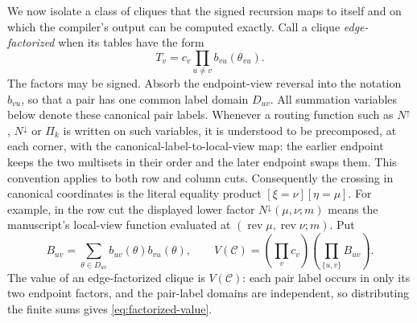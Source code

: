 \documentclass[11pt]{article}
\theoremstyle{definition}
\theoremstyle{remark}
\begin{document}
We now isolate a class of cliques that the signed recursion maps to
itself and on which the compiler's output can be computed exactly.
Call a clique \emph{edge-factorized} when its tables have the form
\[
 T_v=c_v\prod_{u\ne v}b_{vu}(\theta_{vu}).
 \tag{\thesection.5}\label{eq:edge-factorized}
\]
The factors may be signed. Absorb the endpoint-view reversal into the
notation $b_{vu}$, so that a pair has one common label domain $D_{uv}$.
All summation variables below denote these canonical pair labels.
Whenever a routing function such as $N^{\uparrow}$,
$N^{\downarrow}$ or $\Pi_k$ is written on such variables, it
is understood to be precomposed, at each corner, with the
canonical-label-to-local-view map: the earlier endpoint keeps
the two multisets in their order and the later endpoint swaps
them. This convention applies to both row and column cuts.
Consequently the crossing in canonical coordinates is the literal
equality product $[\xi=\nu][\eta=\mu]$. For example, in the
row cut the displayed lower factor
$N^{\downarrow}(\mu,\nu;m)$ means the manuscript's local-view
function evaluated at $(\operatorname{rev}\mu,
\operatorname{rev}\nu;m)$.
Put
\[
 B_{uv}=\sum_{\theta\in D_{uv}}b_{uv}(\theta)b_{vu}(\theta),
 \qquad
 V(\mathcal C)=\left(\prod_vc_v\right)\left(\prod_{\{u,v\}}B_{uv}\right).
 \tag{\thesection.6}\label{eq:factorized-value}
\]
The value of an edge-factorized clique is $V(\mathcal C)$: each pair
label occurs in only its two endpoint factors, and the pair-label
domains are independent, so distributing the finite sums gives
\eqref{eq:factorized-value}.
\end{document}
